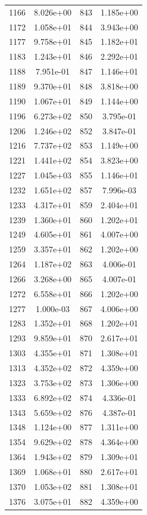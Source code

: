 \documentclass[12pt]{article}
\begin{document}
\begin{longtable}{@{}cccc@{}}
1166 & 8.026e+00 & 843 & 1.185e+00 \\
1172 & 1.058e+01 & 844 & 3.943e+00 \\
1177 & 9.758e+01 & 845 & 1.182e+01 \\
1183 & 1.243e+01 & 846 & 2.292e+01 \\
1188 & 7.951e-01 & 847 & 1.146e+01 \\
1189 & 9.370e+01 & 848 & 3.818e+00 \\
1190 & 1.067e+01 & 849 & 1.144e+00 \\
1196 & 6.273e+02 & 850 & 3.795e-01 \\
1206 & 1.246e+02 & 852 & 3.847e-01 \\
1216 & 7.737e+02 & 853 & 1.149e+00 \\
1221 & 1.441e+02 & 854 & 3.823e+00 \\
1227 & 1.045e+03 & 855 & 1.146e+01 \\
1232 & 1.651e+02 & 857 & 7.996e-03 \\
1233 & 4.317e+01 & 859 & 2.404e+01 \\
1239 & 1.360e+01 & 860 & 1.202e+01 \\
1249 & 4.605e+01 & 861 & 4.007e+00 \\
1259 & 3.357e+01 & 862 & 1.202e+00 \\
1264 & 1.187e+02 & 863 & 4.006e-01 \\
1266 & 3.268e+00 & 865 & 4.007e-01 \\
1272 & 6.558e+01 & 866 & 1.202e+00 \\
1277 & 1.000e-03 & 867 & 4.006e+00 \\
1283 & 1.352e+01 & 868 & 1.202e+01 \\
1293 & 9.859e+01 & 870 & 2.617e+01 \\
1303 & 4.355e+01 & 871 & 1.308e+01 \\
1313 & 4.352e+02 & 872 & 4.359e+00 \\
1323 & 3.753e+02 & 873 & 1.306e+00 \\
1333 & 6.892e+02 & 874 & 4.336e-01 \\
1343 & 5.659e+02 & 876 & 4.387e-01 \\
1348 & 1.124e+00 & 877 & 1.311e+00 \\
1354 & 9.629e+02 & 878 & 4.364e+00 \\
1364 & 1.943e+02 & 879 & 1.309e+01 \\
1369 & 1.068e+01 & 880 & 2.617e+01 \\
1370 & 1.053e+02 & 881 & 1.308e+01 \\
1376 & 3.075e+01 & 882 & 4.359e+00 \\

\end{longtable}
\end{document}
